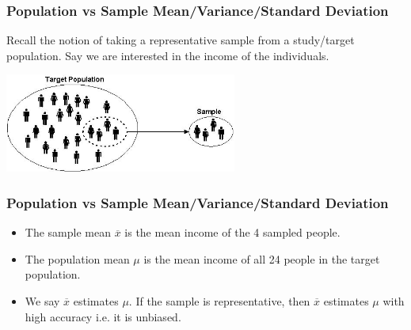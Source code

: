 \documentclass[handout]{beamer}
\newcommand{\blue}[1]{\textcolor{blue2}{#1}}
\begin{document}
\begin{frame}[fragile]
\frametitle{Population vs Sample Mean/Variance/Standard Deviation}

Recall the notion of taking a \blue{representative sample} from a \blue{study/target population}.  Say we are interested in the income of the individuals.   

\vspace{0.25cm}

\begin{center}
\includegraphics[width=3in]{figure/target-population.jpg} 
\end{center}


\end{frame}


\begin{frame}[fragile]
\frametitle{Population vs Sample Mean/Variance/Standard Deviation}
\begin{itemize}
\item The \blue{sample mean $\overline{x}$} is the mean income of the 4 sampled people.
\pause\item The \blue{population mean $\mu$} is the mean income of all 24 people in the target population.
\pause\item We say $\overline{x}$ \blue{estimates} $\mu$.  If the sample is representative, then $\overline{x}$ estimates $\mu$ with high \blue{accuracy} i.e. it is unbiased.
\end{itemize}

\end{frame}
\end{document}
